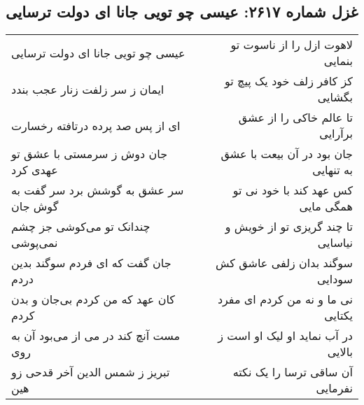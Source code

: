 \begin{center}
\section*{غزل شماره ۲۶۱۷: عیسی چو تویی جانا ای دولت ترسایی}
\label{sec:2617}
\begin{longtable}{l p{0.5cm} r}
عیسی چو تویی جانا ای دولت ترسایی
&&
لاهوت ازل را از ناسوت تو بنمایی
\\
ایمان ز سر زلفت زنار عجب بندد
&&
کز کافر زلف خود یک پیچ تو بگشایی
\\
ای از پس صد پرده درتافته رخسارت
&&
تا عالم خاکی را از عشق برآرایی
\\
جان دوش ز سرمستی با عشق تو عهدی کرد
&&
جان بود در آن بیعت با عشق به تنهایی
\\
سر عشق به گوشش برد سر گفت به گوش جان
&&
کس عهد کند با خود نی تو همگی مایی
\\
چندانک تو می‌کوشی جز چشم نمی‌پوشی
&&
تا چند گریزی تو از خویش و نیاسایی
\\
جان گفت که ای فردم سوگند بدین دردم
&&
سوگند بدان زلفی عاشق کش سودایی
\\
کان عهد که من کردم بی‌جان و بدن کردم
&&
نی ما و نه من کردم ای مفرد یکتایی
\\
مست آنچ کند در می از می‌بود آن به روی
&&
در آب نماید او لیک او است ز بالایی
\\
تبریز ز شمس الدین آخر قدحی زو هین
&&
آن ساقی ترسا را یک نکته نفرمایی
\\
\end{longtable}
\end{center}
